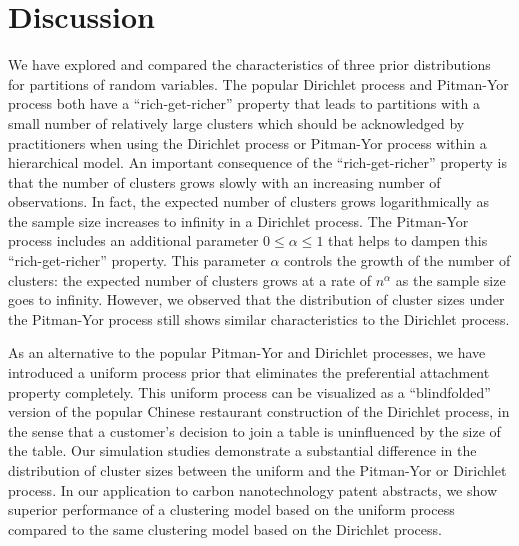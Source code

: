 \documentclass[]{article}
\begin{document}
\section{Discussion}\label{discussion}

We have explored and compared the characteristics of three prior
distributions for partitions of random variables.  The popular
Dirichlet process and Pitman-Yor process both have a
``rich-get-richer'' property that leads to partitions with a small
number of relatively large clusters which should be acknowledged by
practitioners when using the Dirichlet process or Pitman-Yor process
within a hierarchical model.  An important consequence of the
``rich-get-richer'' property is that the number of clusters grows
slowly with an
increasing number of observations.  In fact, the expected number of
clusters grows logarithmically as the sample size increases to
infinity in a Dirichlet process.  The Pitman-Yor process 
includes an additional parameter $0 \leq \alpha \leq 1$ that helps to
dampen this ``rich-get-richer'' property.  This parameter $\alpha$
controls the growth of the number of clusters: the expected number of
clusters grows at a rate of $n^\alpha$ as the sample size goes to
infinity.  However, we observed that the distribution of cluster sizes
under the Pitman-Yor process still shows similar characteristics to
the Dirichlet process.

As an alternative to the popular Pitman-Yor and Dirichlet processes,
we have introduced a uniform process prior that eliminates the
preferential attachment property completely.  This uniform process can
be visualized as a ``blindfolded'' version of the popular Chinese
restaurant construction of the Dirichlet process, in the sense that a
customer's decision to join a table is uninfluenced by the size of the
table.  Our simulation studies demonstrate a substantial difference in
the distribution of cluster sizes between the uniform and the
Pitman-Yor or Dirichlet process.  In our application to carbon
nanotechnology patent abstracts, we show superior performance of a
clustering model based on the uniform process compared to the same
clustering model based on the Dirichlet process.

\end{document}
